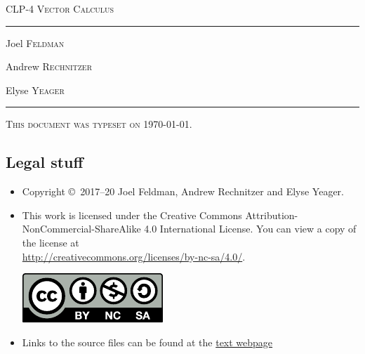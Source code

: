 \documentclass[12pt,letterpaper, openany]{book}
\begin{document}
\setcounter{page}{0}

\begin{titlepage} 
\begin{center} 
\textsc{\LARGE
CLP-4 Vector Calculus
}\\[2ex]

\vspace{5ex}
\hrule
\vspace{5ex}

\begin{minipage}[t]{0.3\textwidth} \begin{flushleft}
\large Joel \textsc{Feldman}
\end{flushleft} \end{minipage}%
\begin{minipage}[t]{0.3\textwidth} \begin{flushleft}
\large Andrew \textsc{Rechnitzer}
\end{flushleft} \end{minipage}%
\begin{minipage}[t]{0.3\textwidth} \begin{flushright}
\large Elyse \textsc{Yeager}
\end{flushright} \end{minipage}%
\end{center}
\vspace{2ex}
\hrule

\vfill
\textsc{This document was typeset on \today.}
\end{titlepage}

\subsection*{Legal stuff}
\begin{itemize}
 \item Copyright \copyright\ 2017--20 Joel Feldman, Andrew Rechnitzer and Elyse Yeager.

\item This work is licensed under the
Creative Commons Attribution-NonCommercial-ShareAlike 4.0 International
License. You can view a copy of the license at \\
\url{http://creativecommons.org/licenses/by-nc-sa/4.0/}.
\begin{center}
 \includegraphics{by-nc-sa.pdf}
\end{center}


\item Links to the source files can be found at the \href{http://www.math.ubc.ca/~CLP/index.html}{text webpage}
\end{itemize}
\end{document}
